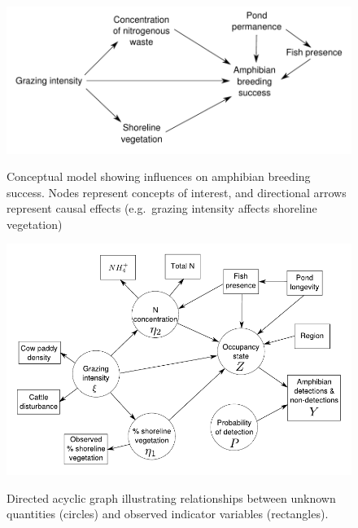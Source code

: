 \begin{figure}[htbp]
\caption[Conceptual model showing influences on amphibian breeding success.]{
Conceptual model showing influences on amphibian breeding success. Nodes
represent concepts of interest, and directional arrows represent causal
effects (e.g.~grazing intensity affects shoreline vegetation)
}
\centering
\includegraphics[width=150mm]{figs/ch3/fig1.pdf}
\label{3-1}
\end{figure}

\begin{figure}[htbp]
\caption[DAG relating latent and observed variables.]{
Directed acyclic graph illustrating relationships between unknown
quantities (circles) and observed indicator variables (rectangles).
}
\centering
\includegraphics[width=150mm]{figs/ch3/fig2.pdf}
\label{3-2}
\end{figure}

